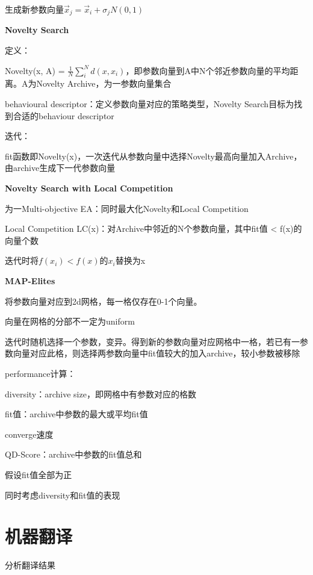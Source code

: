 \documentclass[UTF8]{ctexart}
\begin{document}
  \quad \quad \quad 生成新参数向量$\vec{x}_j = \vec{x}_i + \sigma_jN(0, 1)$

  \textbf{Novelty Search}

  \quad 定义：
  
  \quad \quad Novelty(x, A) = $\frac{1}{N}\sum_i^{N}d(x, x_i)$，即参数向量到A中N个邻近参数向量的平均距离。A为Novelty Archive，为一参数向量集合

  \quad \quad behavioural descriptor：定义参数向量对应的策略类型，Novelty Search目标为找到合适的behaviour descriptor

  \quad 迭代：

  \quad \quad fit函数即Novelty(x)，一次迭代从参数向量中选择Novelty最高向量加入Archive，由archive生成下一代参数向量

  \textbf{Novelty Search with Local Competition}

  \quad 为一Multi-objective EA：同时最大化Novelty和Local Competition

  \quad Local Competition LC(x)：对Archive中邻近的N个参数向量，其中fit值 < f(x)的向量个数

  \quad \quad 迭代时将$f(x_i) < f(x)$的$x_i$替换为x

  \textbf{MAP-Elites}

  \quad 将参数向量对应到2d网格，每一格仅存在0-1个向量。

  \quad \quad 向量在网格的分部不一定为uniform

  \quad 迭代时随机选择一个参数，变异。得到新的参数向量对应网格中一格，若已有一参数向量对应此格，则选择两参数向量中fit值较大的加入archive，较小参数被移除

  \quad performance计算：

  \quad \quad diversity：archive size，即网格中有参数对应的格数

  \quad \quad fit值：archive中参数的最大或平均fit值

  \quad \quad converge速度

  \quad \quad QD-Score：archive中参数的fit值总和

  \quad \quad \quad 假设fit值全部为正

  \quad \quad \quad 同时考虑diversity和fit值的表现

\section{机器翻译}
\noindent 分析翻译结果
\end{document}
